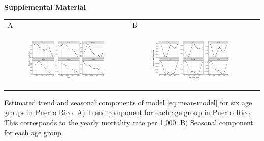 \documentclass[11pt]{article}
\begin{document}
\newpage



\newpage
\begin{center}
\LARGE{\textbf{Supplemental Material}}
\end{center}

\begin{suppfigure}[ht]
	\begin{tabular}{lll}
	A&B\\
	\begin{subfigure}[t]{0.49\linewidth}
		\centering
		\includegraphics[width=1\linewidth]{figs/supp-figure-1a.pdf} 
	\end{subfigure}&
	\begin{subfigure}[t]{0.49\linewidth}
		\centering
		\includegraphics[width=1\linewidth]{figs/supp-figure-1b.pdf}
	\end{subfigure}&\\
    \end{tabular}
    \caption{Estimated trend and seasonal components of model \ref{eq:mean-model} for six age groups in Puerto Rico. A) Trend component for each age group in Puerto Rico. This corresponds to the yearly mortality rate per 1,000. B) Seasonal component for each age group.}
    \label{supp-fig:model-components}
\end{suppfigure}
\end{document}
